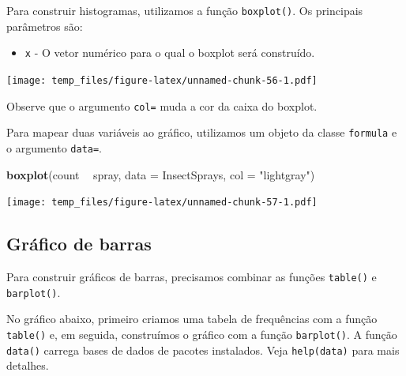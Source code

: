 \documentclass[
]{book}
\newenvironment{Shaded}{\begin{snugshade}}{\end{snugshade}}
\newcommand{\CommentTok}[1]{\textcolor[rgb]{0.56,0.35,0.01}{\textit{#1}}}
\newcommand{\DataTypeTok}[1]{\textcolor[rgb]{0.13,0.29,0.53}{#1}}
\newcommand{\KeywordTok}[1]{\textcolor[rgb]{0.13,0.29,0.53}{\textbf{#1}}}
\newcommand{\NormalTok}[1]{#1}
\newcommand{\OperatorTok}[1]{\textcolor[rgb]{0.81,0.36,0.00}{\textbf{#1}}}
\newcommand{\StringTok}[1]{\textcolor[rgb]{0.31,0.60,0.02}{#1}}
\providecommand{\tightlist}{%
  \setlength{\itemsep}{0pt}\setlength{\parskip}{0pt}}
\begin{document}
Para construir histogramas, utilizamos a função \texttt{boxplot()}. Os principais parâmetros são:

\begin{itemize}
\tightlist
\item
  \texttt{x} - O vetor numérico para o qual o boxplot será construído.
\end{itemize}

\begin{Shaded}
\end{Shaded}

\texttt{[image: temp\_files/figure-latex/unnamed-chunk-56-1.pdf]}

Observe que o argumento \texttt{col=} muda a cor da caixa do boxplot.

Para mapear duas variáveis ao gráfico, utilizamos um objeto da classe \texttt{formula} e o argumento \texttt{data=}.

\begin{Shaded}
\begin{Highlighting}[]
\KeywordTok{boxplot}\NormalTok{(count }\OperatorTok{~}\StringTok{ }\NormalTok{spray, }\DataTypeTok{data =}\NormalTok{ InsectSprays, }\DataTypeTok{col =} \StringTok{"lightgray"}\NormalTok{)}
\end{Highlighting}
\end{Shaded}

\texttt{[image: temp\_files/figure-latex/unnamed-chunk-57-1.pdf]}

\hypertarget{gruxe1fico-de-barras}{%
\subsection{Gráfico de barras}\label{gruxe1fico-de-barras}}

Para construir gráficos de barras, precisamos combinar as funções \texttt{table()} e \texttt{barplot()}.

No gráfico abaixo, primeiro criamos uma tabela de frequências com a função \texttt{table()} e, em seguida, construímos o gráfico com a função \texttt{barplot()}. A função \texttt{data()} carrega bases de dados de pacotes instalados. Veja \texttt{help(data)} para mais detalhes.

\begin{Shaded}
\end{Shaded}
\end{document}
